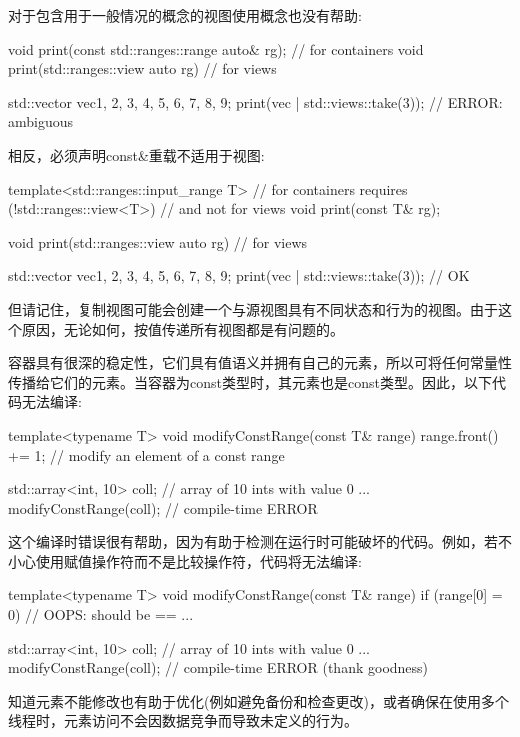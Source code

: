 对于包含用于一般情况的概念的视图使用概念也没有帮助:

\begin{cpp}
void print(const std::ranges::range auto& rg); // for containers
void print(std::ranges::view auto rg) // for views

std::vector vec{1, 2, 3, 4, 5, 6, 7, 8, 9};
print(vec | std::views::take(3)); // ERROR: ambiguous
\end{cpp}

相反，必须声明const\&重载不适用于视图:

\begin{cpp}
template<std::ranges::input_range T> // for containers
requires (!std::ranges::view<T>) // and not for views
void print(const T& rg);

void print(std::ranges::view auto rg) // for views

std::vector vec{1, 2, 3, 4, 5, 6, 7, 8, 9};
print(vec | std::views::take(3)); // OK
\end{cpp}

但请记住，复制视图可能会创建一个与源视图具有不同状态和行为的视图。由于这个原因，无论如何，按值传递所有视图都是有问题的。


容器具有很深的稳定性，它们具有值语义并拥有自己的元素，所以可将任何常量性传播给它们的元素。当容器为const类型时，其元素也是const类型。因此，以下代码无法编译:

\begin{cpp}
template<typename T>
void modifyConstRange(const T& range)
{
	range.front() += 1; // modify an element of a const range
}

std::array<int, 10> coll{}; // array of 10 ints with value 0
...
modifyConstRange(coll); // compile-time ERROR
\end{cpp}

这个编译时错误很有帮助，因为有助于检测在运行时可能破坏的代码。例如，若不小心使用赋值操作符而不是比较操作符，代码将无法编译:

\begin{cpp}
template<typename T>
void modifyConstRange(const T& range)
{
	if (range[0] = 0) { // OOPS: should be ==
		...
	}
}

std::array<int, 10> coll{}; // array of 10 ints with value 0
...
modifyConstRange(coll); // compile-time ERROR (thank goodness)
\end{cpp}

知道元素不能修改也有助于优化(例如避免备份和检查更改)，或者确保在使用多个线程时，元素访问不会因数据竞争而导致未定义的行为。

